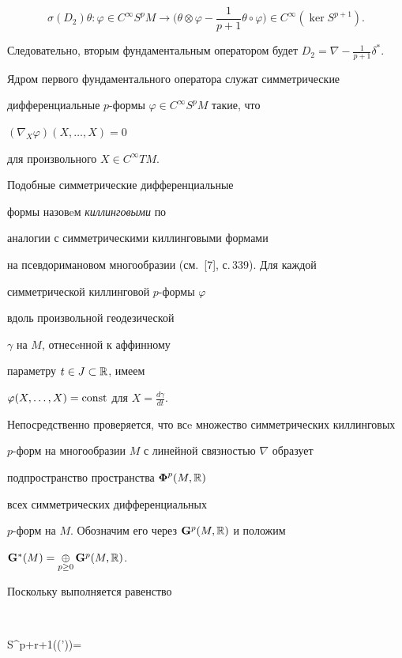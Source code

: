 \begin{pf}
$$


\sigma(D_2)\theta : \varphi \in C^\infty S^p M \to \bigg(\theta \otimes


\varphi - \frac{1}{p+1}\theta \circ \varphi\bigg) \in C^\infty(\ker S^{p+1}).


$$


Следовательно, вторым фундаментальным оператором будет $D_2=\nabla


-\frac{1}{p+1}\delta^*$.





Ядром первого фундаментального оператора служат симметрические 


дифференциальные $p$-формы $\varphi \in C^\infty S^pM$ такие, что


$(\nabla_X \varphi)(X,\dotsc,X)=0$


для произвольного $X\in C^\infty TM$. 


Подобные симметрические дифференциальные


формы назовeм {\it киллинговыми} по 


аналогии с симметрическими киллинговыми формами


на псевдоримановом многообразии (см.~[7], с.\,339). Для каждой


симметрической киллинговой $p$-формы $\varphi$ 


вдоль произвольной геодезической


$\gamma$ на $M$, отнесeнной к аффинному 


параметру $t \in J \subset \Bbb R$, имеем


$\varphi(X,\dotsc,X)=\operatorname{const}$ для $X=\frac{d\gamma}{dt}$.





Непосредственно проверяется, что всe множество симметрических киллинговых


$p$-форм на многообразии $M$ с линейной связностью $\nabla$ образует


подпространство пространства ${\boldsymbol \Phi}^p(M,\Bbb R)$


всех симметрических дифференциальных


$p$-форм на $M$. Обозначим его через ${\bold G}^p(M,\Bbb R)$ и положим


${\bold G}^*(M)= \mathop{\oplus}\limits_{p\ge0} {\bold G}^p (M,\Bbb R)$.


Поскольку выполняется равенство


$$


S^{p+r+1}(\nabla(\varphi \circ \varphi'))=



\end{pf}
